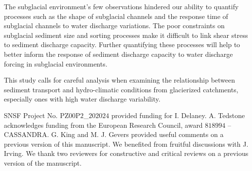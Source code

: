 \documentclass[esurf, manuscript]{copernicus}
\begin{document}
The subglacial environment's few observations hindered our ability to quantify processes such as
the shape of subglacial channels and the response time of subglacial channels to water discharge variations.
The poor constraints on subglacial sediment size and sorting processes make it difficult to link shear stress to sediment discharge capacity.
Further quantifying these processes will help to better inform the response of sediment discharge capacity to water discharge forcing in subglacial environments.

This study calls for careful analysis when examining the relationship between sediment transport and hydro-climatic conditions from glacierized catchments, especially ones with high water discharge variability.




\begin{acknowledgements}
  SNSF Project No. $\mathrm{PZ00P2}$\_$202024$ provided  funding for I. Delaney.
  A. Tedstone acknowledges funding from the European Research Council, award $818994$ -- CASSANDRA.
  G. King and M. J. Gevers provided useful comments on a previous version of this manuscript.
  We benefited from fruitful discussions with J. Irving.
  We thank two reviewers for constructive and critical reviews on a previous version of the manuscript.
\end{acknowledgements}
\newpage

\end{document}
